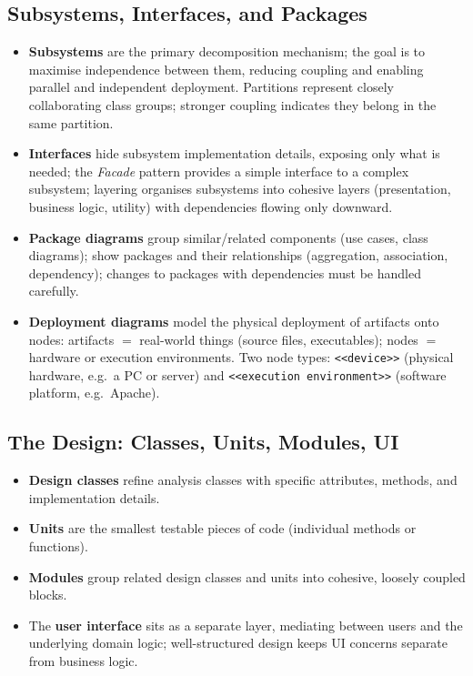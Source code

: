 \documentclass[hidelinks]{article}
\begin{document}
\subsection{Subsystems, Interfaces, and Packages}
\begin{itemize}
  \item \textbf{Subsystems} are the primary decomposition mechanism; the goal is to maximise
        independence between them, reducing coupling and enabling parallel and independent
        deployment. Partitions represent closely collaborating class groups; stronger coupling indicates
        they belong in the same partition.
  \item \textbf{Interfaces} hide subsystem implementation details, exposing only what is needed;
        the \emph{Facade} pattern provides a simple interface to a complex subsystem; layering
        organises subsystems into cohesive layers (presentation, business logic, utility) with
        dependencies flowing only downward.
  \item \textbf{Package diagrams} group similar/related components (use cases, class diagrams);
        show packages and their relationships (aggregation, association, dependency); changes to
        packages with dependencies must be handled carefully.
  \item \textbf{Deployment diagrams} model the physical deployment of artifacts onto nodes:
        artifacts $=$ real-world things (source files, executables); nodes $=$ hardware or execution
        environments. Two node types: \texttt{<{}<device>{}>} (physical hardware, e.g.\ a PC or
        server) and \texttt{<{}<execution environment>{}>} (software platform, e.g.\ Apache).
\end{itemize}

\subsection{The Design: Classes, Units, Modules, UI}
\begin{itemize}
  \item \textbf{Design classes} refine analysis classes with specific attributes, methods, and
        implementation details.
  \item \textbf{Units} are the smallest testable pieces of code (individual methods or functions).
  \item \textbf{Modules} group related design classes and units into cohesive, loosely coupled blocks.
  \item The \textbf{user interface} sits as a separate layer, mediating between users and the underlying
        domain logic; well-structured design keeps UI concerns separate from business logic.
\end{itemize}
\end{document}
